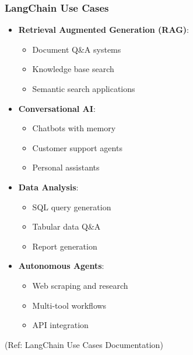 \begin{frame}\frametitle{LangChain Use Cases}

\begin{itemize}
\item \textbf{Retrieval Augmented Generation (RAG)}:
    \begin{itemize}
    \item Document Q\&A systems
    \item Knowledge base search
    \item Semantic search applications
    \end{itemize}

\item \textbf{Conversational AI}:
    \begin{itemize}
    \item Chatbots with memory
    \item Customer support agents
    \item Personal assistants
    \end{itemize}

\item \textbf{Data Analysis}:
    \begin{itemize}
    \item SQL query generation
    \item Tabular data Q\&A
    \item Report generation
    \end{itemize}

\item \textbf{Autonomous Agents}:
    \begin{itemize}
    \item Web scraping and research
    \item Multi-tool workflows
    \item API integration
    \end{itemize}
\end{itemize}

{\tiny (Ref: LangChain Use Cases Documentation)}
\end{frame}

